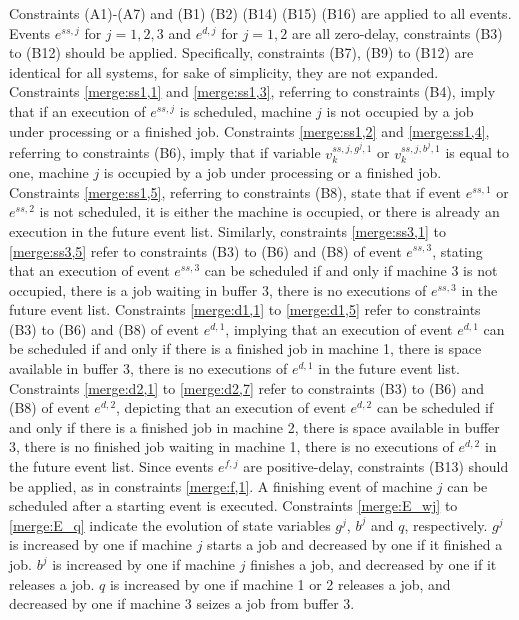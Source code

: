\documentclass[]{interact}
\theoremstyle{plain}%
\theoremstyle{definition}
\theoremstyle{remark}
\begin{document}
Constraints (A1)-(A7) and (B1) (B2) (B14) (B15) (B16) are applied to all events. Events $e^{ss,j}$ for $j=1,2,3$ and $e^{d,j}$ for $j=1,2$ are all zero-delay, constraints (B3) to (B12) should be applied. Specifically, constraints (B7), (B9) to (B12) are identical for all systems, for sake of simplicity, they are not expanded. Constraints \eqref{merge:ss1,1} and \eqref{merge:ss1,3}, referring to constraints (B4), imply that if an execution of $e^{ss,j}$ is scheduled, machine $j$ is not occupied by a job under processing or a finished job. Constraints \eqref{merge:ss1,2} and \eqref{merge:ss1,4}, referring to constraints (B6), imply that if variable $v^{ss,j,g^j,1}_k$ or $v^{ss,j,b^j,1}_k$ is equal to one, machine $j$ is occupied by a job under processing or a finished job. Constraints \eqref{merge:ss1,5}, referring to constraints (B8), state that if event $e^{ss,1}$ or $e^{ss,2}$ is not scheduled, it is either the machine is occupied, or there is already an execution in the future event list. Similarly, constraints \eqref{merge:ss3,1} to \eqref{merge:ss3,5} refer to constraints (B3) to (B6) and (B8) of event $e^{ss,3}$, stating that an execution of event $e^{ss,3}$ can be scheduled if and only if machine 3 is not occupied, there is a job waiting in buffer 3, there is no executions of $e^{ss,3}$ in the future event list. Constraints \eqref{merge:d1,1} to \eqref{merge:d1,5} refer to constraints (B3) to (B6) and (B8) of event $e^{d,1}$, implying that an execution of event $e^{d,1}$ can be scheduled if and only if there is a finished job in machine 1, there is space available in buffer 3, there is no executions of $e^{d,1}$ in the future event list. Constraints \eqref{merge:d2,1} to \eqref{merge:d2,7} refer to constraints (B3) to (B6) and (B8) of event $e^{d,2}$, depicting that an execution of event $e^{d,2}$ can be scheduled if and only if there is a finished job in machine 2, there is space available in buffer 3, there is no finished job waiting in machine 1, there is no executions of $e^{d,2}$ in the future event list. Since events $e^{f,j}$ are positive-delay, constraints (B13) should be applied, as in constraints \eqref{merge:f,1}. A finishing event of machine $j$ can be scheduled after a starting event is executed. Constraints \eqref{merge:E_wj} to \eqref{merge:E_q} indicate the evolution of state variables $g^j$, $b^j$ and $q$, respectively. $g^j$ is increased by one if machine $j$ starts a job and decreased by one if it finished a job. $b^j$ is increased by one if machine $j$ finishes a job, and decreased by one if it releases a job. $q$ is increased by one if machine 1 or 2 releases a job, and decreased by one if machine 3 seizes a job from buffer 3.
\end{document}
